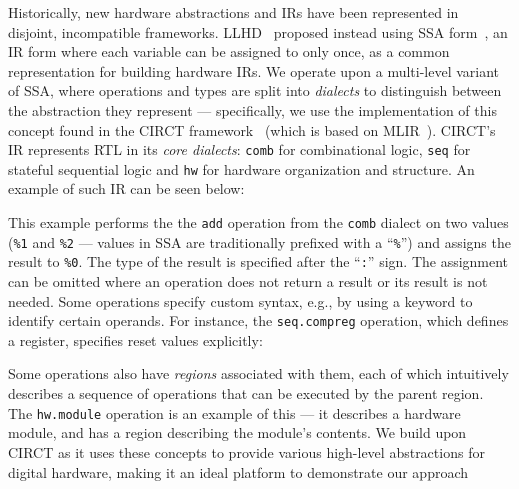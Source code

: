 \documentclass[acmsmall,screen,review]{acmart}
\begin{document}
Historically, new hardware abstractions and IRs have been represented in disjoint, incompatible frameworks.
LLHD~\cite{schuiki2020llhd} proposed instead using SSA form~\cite{cytron1991efficiently}, an IR form where each variable can be assigned to only once, as a common representation for building hardware IRs.
We operate upon a multi-level variant of SSA, where operations and types are split into \textit{dialects} to distinguish between the abstraction they represent --- specifically, we use the implementation of this concept found in the CIRCT framework~\cite{CIRCT, mlir_circt} (which is based on MLIR~\cite{mlir}).
CIRCT's IR represents RTL in its \textit{core dialects}: \texttt{comb} for combinational logic, \texttt{seq} for stateful sequential logic and \texttt{hw} for hardware organization and structure.
An example of such IR can be seen below:
\begin{xdsl}
\end{xdsl}
This example performs the the \texttt{add} operation from the \texttt{comb} dialect on two values (\texttt{\%1} and \texttt{\%2} --- values in SSA are traditionally prefixed with a ``\texttt{\%}'') and assigns the result to \texttt{\%0}.
The type of the result is specified after the ``\texttt{:}'' sign.
The assignment can be omitted where an operation does not return a result or its result is not needed.
Some operations specify custom syntax, e.g., by using a keyword to identify certain operands.
For instance, the \texttt{seq.compreg} operation, which defines a register, specifies reset values explicitly: 
\begin{xdsl}
\end{xdsl}
Some operations also have \textit{regions} associated with them, each of which intuitively describes a sequence of operations that can be executed by the parent region.
The \texttt{hw.module} operation is an example of this --- it describes a hardware module, and has a region describing the module's contents.
We build upon CIRCT as it uses these concepts to provide various high-level abstractions for digital hardware, making it an ideal platform to demonstrate our approach
\end{document}
